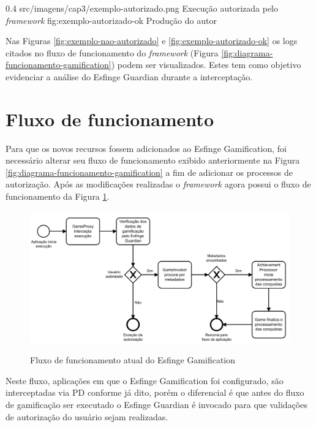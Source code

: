 \begin{image}
{0.4}
{src/imagens/cap3/exemplo-autorizado.png}
{Execução autorizada pelo \textit{framework}}
{fig:exemplo-autorizado-ok}
{Produção do autor}
\end{image}

\par Nas Figuras \ref{fig:exemplo-nao-autorizado} e \ref{fig:exemplo-autorizado-ok} os logs citados no fluxo de funcionamento do \textit{framework} (Figura  \ref{fig:diagrama-funcionamento-gamification}) podem ser visualizados. Estes tem como objetivo evidenciar a análise do Esfinge Guardian durante a interceptação. 

\section{Fluxo de funcionamento}

\par Para que os novos recursos fossem adicionados ao Esfinge Gamification, foi necessário alterar seu fluxo de funcionamento exibido anteriormente na Figura \ref{fig:diagrama-funcionamento-gamification} a fim de adicionar os processos de autorização. Após as modificações realizadas o \textit{framework} agora possui o fluxo de funcionamento da Figura \ref{fig:fluxo-atual}.

\begin{figure}[H]
    \centering
    \caption{Fluxo de funcionamento atual do Esfinge Gamification}
    \includegraphics[scale=0.3]{src/imagens/cap3/fluxo-atual.png}
    \label{fig:fluxo-atual}
\end{figure}

\par Neste fluxo, aplicações em que o Esfinge Gamification foi configurado, são interceptadas via PD conforme já dito, porém o diferencial é que antes do fluxo de gamificação ser executado o Esfinge Guardian é invocado para que validações de autorização do usuário sejam realizadas. 

